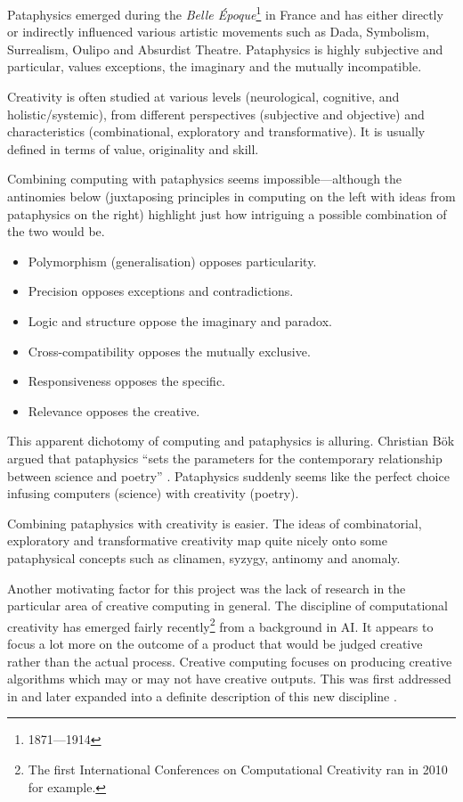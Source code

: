 Pataphysics emerged during the \textit{Belle Époque}\footnote{1871---1914} in France and has either directly or indirectly influenced various artistic movements such as Dada, Symbolism, Surrealism, Oulipo and Absurdist Theatre. Pataphysics is highly subjective and particular, values exceptions, the imaginary and the mutually incompatible.

Creativity is often studied at various levels (neurological, cognitive, and holistic/systemic), from different perspectives (subjective and objective) and characteristics (combinational, exploratory and transformative). It is usually defined in terms of value, originality and skill.

Combining computing with pataphysics seems impossible---although the antinomies below (juxtaposing principles in computing on the left with ideas from pataphysics on the right) highlight just how intriguing a possible combination of the two would be.

\begin{itemize}
  \item Polymorphism (generalisation) opposes particularity.
  \item Precision opposes exceptions and contradictions.
  \item Logic and structure oppose the imaginary and paradox.
  \item Cross-compatibility opposes the mutually exclusive.
  \item Responsiveness opposes the specific.
  \item Relevance opposes the creative.
\end{itemize}

This apparent dichotomy of computing and pataphysics is alluring. Christian B{\"o}k argued that pataphysics ``sets the parameters for the contemporary relationship between science and poetry'' \autocite*{Bok2002}. Pataphysics suddenly seems like the perfect choice infusing computers (science) with creativity (poetry).

Combining pataphysics with creativity is easier. The ideas of combinatorial, exploratory and transformative creativity map quite nicely onto some pataphysical concepts such as clinamen, syzygy, antinomy and anomaly. 

Another motivating factor for this project was the lack of research in the particular area of creative computing in general. The discipline of computational creativity has emerged fairly recently\footnote{The first International Conferences on Computational Creativity ran in 2010 for example.} from a background in \ac{AI}. It appears to focus a lot more on the outcome of a product that would be judged creative rather than the actual process. Creative computing focuses on producing creative algorithms which may or may not have creative outputs. This was first addressed in \autocite{Raczinski2013} and later expanded into a definite description of this new discipline \autocite{Hugill2013c}.

